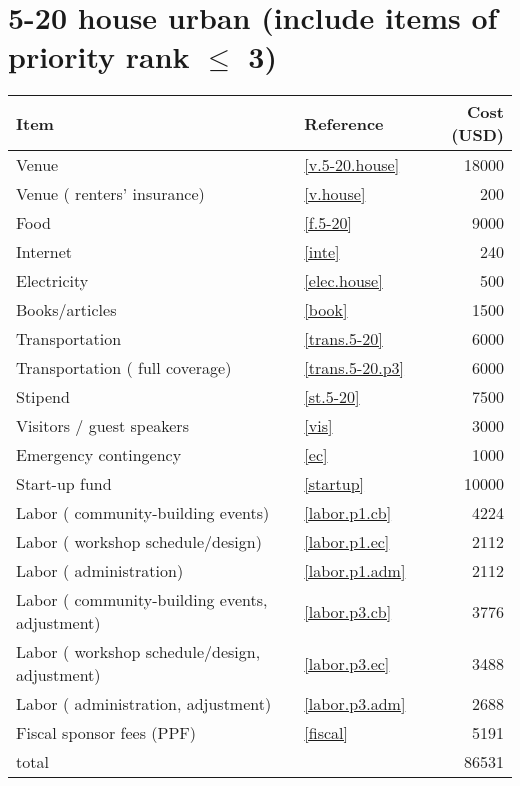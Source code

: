 \section*{5-20 house urban (include items of priority rank $\leq$ 3)}
\begin{center}
\begin{tabular}{llr}
Item & Reference & Cost (USD) \\ \hline
Venue & \ref{v.5-20.house} & 18000 \\
Venue ( renters' insurance) & \ref{v.house} & 200 \\
Food & \ref{f.5-20} & 9000 \\
Internet & \ref{inte} & 240 \\
Electricity & \ref{elec.house} & 500 \\
Books/articles & \ref{book} & 1500 \\
Transportation & \ref{trans.5-20} & 6000 \\
Transportation ( full coverage) & \ref{trans.5-20.p3} & 6000 \\
Stipend & \ref{st.5-20} & 7500 \\
Visitors / guest speakers & \ref{vis} & 3000 \\
Emergency contingency & \ref{ec} & 1000 \\
Start-up fund & \ref{startup} & 10000 \\
Labor ( community-building events) & \ref{labor.p1.cb} & 4224 \\
Labor ( workshop schedule/design) & \ref{labor.p1.ec} & 2112 \\
Labor ( administration) & \ref{labor.p1.adm} & 2112 \\
Labor ( community-building events, adjustment) & \ref{labor.p3.cb} & 3776 \\
Labor ( workshop schedule/design, adjustment) & \ref{labor.p3.ec} & 3488 \\
Labor ( administration, adjustment) & \ref{labor.p3.adm} & 2688 \\
Fiscal sponsor fees (PPF) & \ref{fiscal} & 5191 \\ \hline
total &  & 86531
\end{tabular}
\end{center}
\newpage
